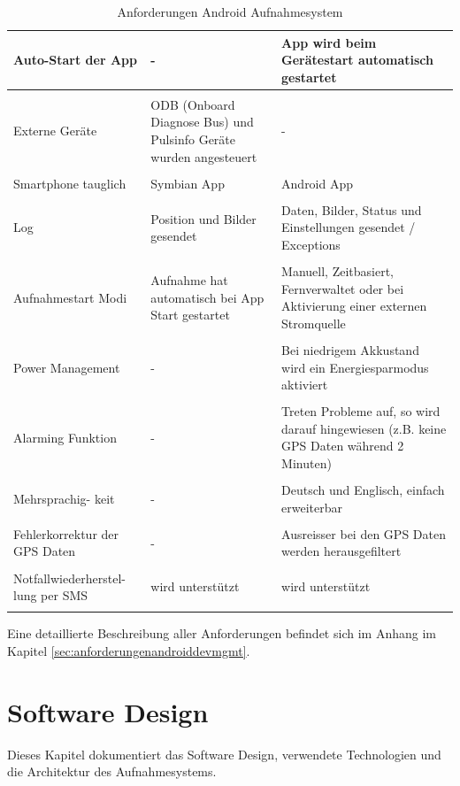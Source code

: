\begin{longtable}{  p{3.5cm} | p{4.3cm} | p{4.3cm} }
	Auto-Start der App & - & App wird beim Ger\"{a}testart automatisch gestartet\\ [1ex] \hline & &  \\ [-1.5ex]
    Externe Ger\"{a}te & ODB (Onboard Diagnose Bus) und Pulsinfo Ger\"{a}te wurden angesteuert & -\\ [1ex] \hline & &  \\ [-1.5ex]
    Smartphone tauglich & Symbian App & Android App\\ [1ex] \hline & &  \\ [-1.5ex]
    Log & Position und Bilder gesendet & Daten, Bilder, Status und Einstellungen gesendet / Exceptions\\ [1ex] \hline & &  \\ [-1.5ex]
    Aufnahmestart Modi & Aufnahme hat automatisch bei App Start gestartet & Manuell, Zeitbasiert, Fernverwaltet oder bei Aktivierung einer externen Stromquelle\\ [1ex] \hline & &  \\ [-1.5ex]
   	Power Management & - & Bei niedrigem Akkustand wird ein Energiesparmodus aktiviert\\ [1ex] \hline & &  \\ [-1.5ex]
    Alarming Funktion & - & Treten Probleme auf, so wird darauf hingewiesen (z.B. keine GPS Daten w\"{a}hrend 2 Minuten)\\ [1ex] \hline & &  \\ [-1.5ex]
    Mehrsprachig- keit & - & Deutsch und Englisch, einfach erweiterbar\\ [1ex] \hline & &  \\ 
    [-1.5ex] Fehlerkorrektur der GPS Daten & - & Ausreisser bei den GPS Daten werden herausgefiltert\\ [1ex] \hline & &  \\ 
    [-1.5ex] Notfallwiederherstel- lung per SMS & wird unterstützt & wird unterstützt\\ [1ex]
    
\caption{Anforderungen Android Aufnahmesystem}
\end{longtable}

Eine detaillierte Beschreibung aller Anforderungen befindet sich im Anhang im Kapitel \ref{sec:anforderungenandroiddevmgmt}.

\section{Software Design}
Dieses Kapitel dokumentiert das Software Design, verwendete Technologien und die Architektur des Aufnahmesystems.

